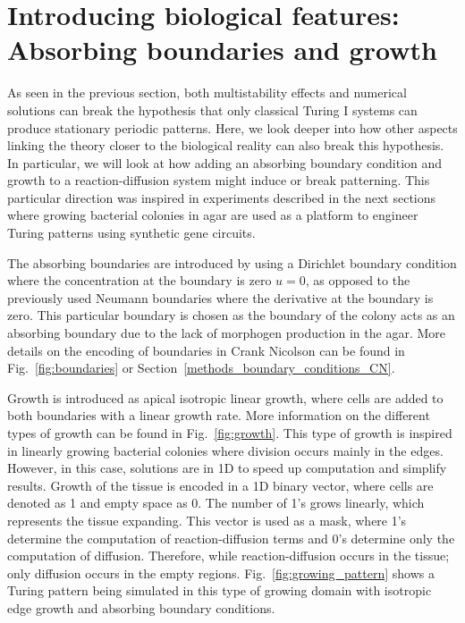 \section{Introducing biological features: Absorbing boundaries and growth}
As seen in the previous section, both multistability effects and numerical solutions can break the hypothesis that only classical Turing I systems can produce stationary periodic patterns.
Here, we look deeper into how other aspects linking the theory closer to the biological reality can also break this hypothesis.
In particular, we will look at how adding an absorbing boundary condition and growth to a reaction-diffusion system might induce or break patterning.
This particular direction was inspired in experiments described in the next sections where growing bacterial colonies in agar are used as a platform to engineer Turing patterns using synthetic gene circuits.

The absorbing boundaries are introduced by using a Dirichlet boundary condition where the concentration at the boundary is zero $u=0$, as opposed to the previously used Neumann boundaries where the derivative at the boundary is zero.
This particular boundary is chosen as the boundary of the colony acts as an absorbing boundary due to the lack of morphogen production in the agar.
More details on the encoding of boundaries in Crank Nicolson can be found in Fig.~\ref{fig:boundaries} or Section~\ref{methods_boundary_conditions_CN}.

Growth is introduced as apical isotropic linear growth, where cells are added to both boundaries with a linear growth rate.
More information on the different types of growth can be found in Fig.~\ref{fig:growth}.
This type of growth is inspired in linearly growing bacterial colonies where division occurs mainly in the edges.
However, in this case, solutions are in 1D to speed up computation and simplify results.
Growth of the tissue is encoded in a 1D binary vector, where cells are denoted as 1 and empty space as 0.
The number of 1's grows linearly, which represents the tissue expanding.
This vector is used as a mask, where 1's determine the computation of reaction-diffusion terms and 0's determine only the computation of diffusion.
Therefore, while reaction-diffusion occurs in the tissue; only diffusion occurs in the empty regions.
Fig.~\ref{fig:growing_pattern} shows a Turing pattern being simulated in this type of growing domain with isotropic edge growth and absorbing boundary conditions.

